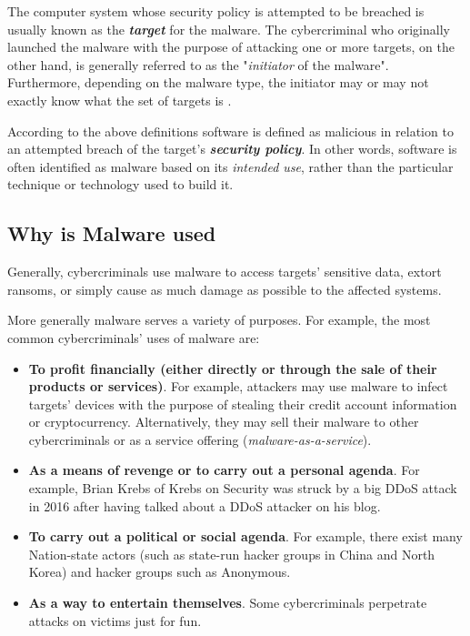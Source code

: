 \documentclass[pdfa%
,cucitura%
]{toptesi}
\begin{document}
The computer system whose security policy is attempted to be breached is usually known as the \textbf{\textit{target}} for the malware. The cybercriminal who originally launched the malware with the purpose of attacking one or more targets, on the other hand, is generally referred to as the "\textit{initiator} of the malware". Furthermore, depending on the malware type, the initiator may or may not exactly know what the set of targets is \cite{SharpAIM}.

According to the above definitions software is defined as malicious in relation to an attempted breach of the target's \textbf{\textit{security policy}}.
In other words, software is often identified as malware based on its \textit{intended use}, rather than the particular technique or technology used to build it.

\subsection{Why is Malware used}
Generally, cybercriminals use malware to access targets' sensitive data, extort ransoms, or simply cause as much damage as possible to the affected systems.

More generally malware serves a variety of purposes. For example, the most common cybercriminals' uses of malware are: \cite{CraneWIM}

\begin{itemize}
	\item \textbf{To profit financially (either directly or through the sale of their products or services)}.
	For example, attackers may use malware to infect targets' devices with the purpose of stealing their credit account information or cryptocurrency. Alternatively, they may sell their malware to other cybercriminals or as a service offering (\textit{malware-as-a-service}).
	
	\item \textbf{As a means of revenge or to carry out a personal agenda}.
	For example, Brian Krebs of Krebs on Security was struck by a big DDoS attack in 2016 after having talked about a DDoS attacker on his blog.
	
	\item \textbf{To carry out a political or social agenda}.
	For example, there exist many Nation-state actors (such as state-run hacker groups in China and North Korea) and hacker groups such as Anonymous.
	
	\item \textbf{As a way to entertain themselves}.
	Some cybercriminals perpetrate attacks on victims just for fun.
\end{itemize}
\end{document}
